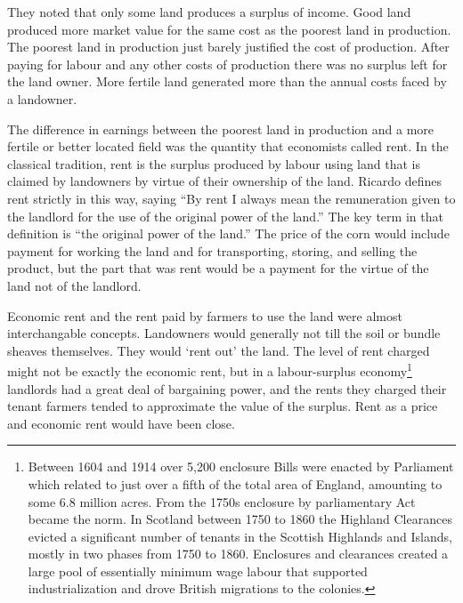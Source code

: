 They noted that only some land produces a surplus of income. Good land produced more market value for the same cost as the poorest land in production. The poorest land in production just barely justified the cost of production. After paying for labour and any other costs of production there was no surplus left for the land owner. More fertile land generated more than the annual costs faced by a landowner. 

The difference in earnings between the poorest land in production and a more fertile or better located field was the quantity that economists called rent. In the classical tradition, rent is the surplus produced by labour using land that is claimed by landowners by virtue of their ownership of the land. Ricardo defines rent strictly in this way, saying ``By rent I always mean the remuneration given to the landlord for the use of the original power of the land.''\cite{ricardoEssayInfluenceLow1815} The key term in that definition is ``the original power of the land.'' The price of the corn would include payment for working the land and for transporting, storing, and  selling the product, but the part that was rent would be a payment for the virtue of the land not of the landlord. %
  
 Economic rent and the rent paid by farmers to use the land were almost interchangable concepts. Landowners would generally not %
 till the soil or bundle sheaves themselves. They would `rent out' the land. The level of rent charged might not be exactly the economic rent, but in a labour-surplus economy\footnote{Between 1604 and 1914 over 5,200 enclosure Bills were enacted by Parliament which related to just over a fifth of the total area of England, amounting to some 6.8 million acres. From the 1750s enclosure by parliamentary Act became the norm. In Scotland  between 1750 to 1860 the  Highland Clearances  evicted a significant number of tenants in the Scottish Highlands and Islands, mostly in two phases from 1750 to 1860. Enclosures and clearances created a large pool of essentially minimum wage labour that supported industrialization and drove British migrations to the colonies. } landlords had a great deal of bargaining power, and the rents they charged their tenant farmers tended to approximate the value of the surplus. Rent as a price and economic rent would have been close. %

